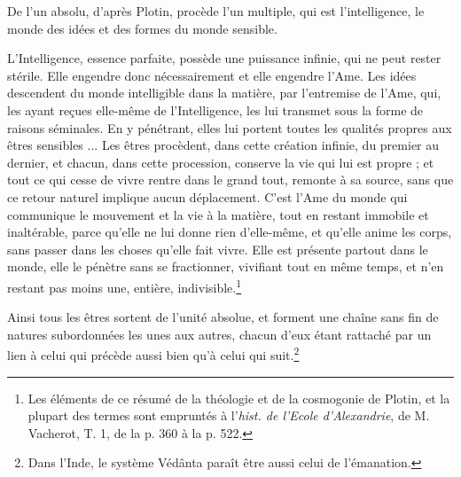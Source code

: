 \documentclass[letterpaper,twocolumn,openany,nodeprecatedcode]{dndbook}
\begin{document}
De l'un absolu, d'après Plotin, procède l'un multiple, qui est l'intelligence, le monde des idées et des formes du monde sensible.

L'Intelligence, essence parfaite, possède une puissance infinie, qui ne peut rester stérile. Elle engendre donc nécessairement et elle engendre l'Ame. Les idées descendent du monde intelligible dans la matière, par l'entremise de l'Ame, qui, les ayant reçues elle-même de l'Intelligence, les lui transmet sous la forme de raisons séminales. En y pénétrant, elles lui portent toutes les qualités propres aux êtres sensibles ... Les êtres procèdent, dans cette création infinie, du premier au dernier, et chacun, dans cette procession, conserve la vie qui lui est propre ; et tout ce qui cesse de vivre rentre dans le grand tout, remonte à sa source, sans que ce retour naturel implique aucun déplacement. C'est l'Ame du monde qui communique le mouvement et la vie à la matière, tout en restant immobile et inaltérable, parce qu'elle ne lui donne rien d'elle-même, et qu'elle anime les corps, sans passer dans les choses qu'elle fait vivre. Elle est présente partout dans le monde, elle le pénètre sans se fractionner, vivifiant tout en même temps, et n'en restant pas moins une, entière, indivisible.\footnote{Les éléments de ce résumé de la théologie et de la cosmogonie de Plotin, et la plupart des termes sont empruntés à l'\emph{hist. de l'Ecole d'Alexandrie}, de M. Vacherot, T. 1, de la p. 360 à la p. 522.}

Ainsi tous les êtres sortent de l'unité absolue, et forment une chaîne sans fin de natures subordonnées les unes aux autres, chacun d'eux étant rattaché par un lien à celui qui précède aussi bien qu'à celui qui suit.\footnote{Dans l'Inde, le système Védânta paraît être aussi celui de l'émanation.}
\end{document}
